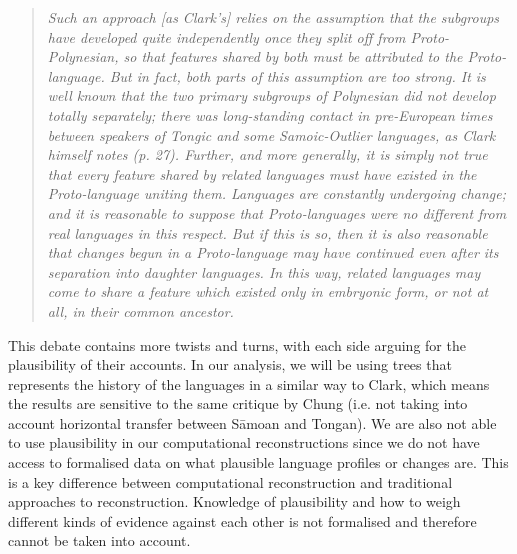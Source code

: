 \documentclass[a4paper,10pt]{article} %
\begin{document}
\begin{quotation}
\noindent\emph{Such an approach [as Clark's] relies on the assumption that the subgroups have developed quite independently once they split off from Proto-Polynesian, so that features shared by both must be attributed to the Proto-language. But in fact, both parts of this assumption are too strong. It is well known that the two primary subgroups of Polynesian did not develop totally separately; there was long-standing contact in pre-European times between speakers of Tongic and some Samoic-Outlier languages, as Clark himself notes (p. 27). Further, and more generally, it is simply not true that every feature shared by related languages must have existed in the Proto-language uniting them. Languages are constantly undergoing change; and it is reasonable to suppose that Proto-languages were no different from real languages in this respect. But if this is so, then it is also reasonable that changes begun in a Proto-language may have continued even after its separation into daughter languages. In this way, related languages may come to share a feature which existed only in embryonic form, or not at all, in their common ancestor.}
\end{quotation}
\begin{flushright} \citet[539]{chung1977aspects}  \end{flushright}

This debate contains more twists and turns, with each side arguing for the plausibility of their accounts. In our analysis, we will be using trees that represents the history of the languages in a similar way to Clark, which means the results are sensitive to the same critique by Chung (i.e. not taking into account horizontal transfer between S\={a}moan and Tongan). We are also not able to use plausibility in our computational reconstructions since we do not have access to formalised data on what plausible language profiles or changes are. This is a key difference between computational reconstruction and traditional approaches to reconstruction. Knowledge of plausibility and how to weigh different kinds of evidence against each other is not formalised and therefore cannot be taken into account.

\end{document}
